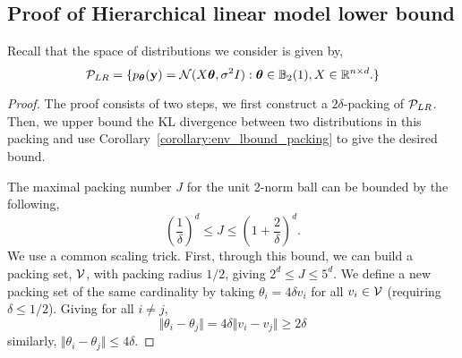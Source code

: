 \subsection{Proof of Hierarchical linear model lower bound}
\label{app:proofs:linear_lower}

Recall that the space of distributions we consider is given by,
\[\mathcal{P}_{LR} = \{ p_{\bm{\theta}}(\mathbf{y}) = \mathcal{N}(X\bm{\theta}, \sigma^2 I): \bm{\theta} \in \mathbb{B}_2(1), X \in \mathbb{R}^{n \times d}. \} \]

\mlreglbound*

\begin{proof}The proof consists of two steps, we first construct a $2\delta$-packing of $\mathcal{P}_{LR}$. Then, we upper bound the KL divergence between two distributions in this packing and use Corollary~\ref{corollary:env_lbound_packing} to give the desired bound.

The maximal packing number $J$ for the unit 2-norm ball can be bounded by the following,
\[ \left(\frac{1}{\delta}\right)^d\leq J \leq \left(1 + \frac{2}{\delta}\right)^d.\]
We use a common scaling trick. First, through this bound, we can build a packing set, $\mathcal{V}$, with packing radius $1/2$, giving $2^d \leq J \leq 5^d$. We define a new packing set of the same cardinality by taking $\theta_i = 4\delta v_i$ for all $v_i \in \mathcal{V}$ (requiring $\delta \leq 1/2$). Giving for all $i \neq j$,
\[ \Vert\theta_i - \theta_j\Vert = 4\delta\Vert v_i - v_j\Vert \geq 2\delta\]
similarly, $\Vert \theta_i - \theta_j\Vert \leq 4\delta$.


\end{proof}
